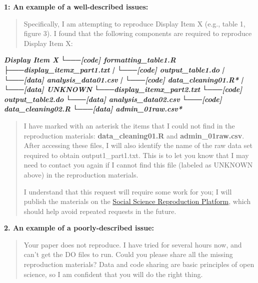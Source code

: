 \documentclass[
]{book}
\newenvironment{Shaded}{\begin{snugshade}}{\end{snugshade}}
\newcommand{\InformationTok}[1]{\textcolor[rgb]{0.56,0.35,0.01}{\textbf{\textit{#1}}}}
\begin{document}
\textbf{1: An example of a well-described issues:}

\begin{quote}
Specifically, I am attempting to reproduce Display Item X (e.g., table 1, figure 3). I found that the following components are required to reproduce Display Item X:
\end{quote}

\begin{Shaded}
\begin{Highlighting}[]
\InformationTok{         Display Item X}
\InformationTok{            └───[code] formatting\_table1.R}
\InformationTok{                ├───display\_itemx\_part1.txt  }
\InformationTok{                |   └───[code] output\_table1.do           }
\InformationTok{                |       └───[data] analysis\_data01.csv}
\InformationTok{                |          └───[code] data\_cleaning01.R*}
\InformationTok{                |             └───[data] UNKNOWN}
\InformationTok{                └───display\_itemx\_part2.txt  }
\InformationTok{                    └───[code] output\_table2.do           }
\InformationTok{                        └───[data] analysis\_data02.csv}
\InformationTok{                           └───[code] data\_cleaning02.R}
\InformationTok{                              └───[data] admin\_01raw.csv* }
\end{Highlighting}
\end{Shaded}

\begin{quote}
I have marked with an asterisk the items that I could not find in the reproduction materials: \textbf{data\_cleaning01.R} and \textbf{admin\_01raw.csv}. After accessing these files, I will also identify the name of the raw data set required to obtain output1\_part1.txt. This is to let you know that I may need to contact you again if I cannot find this file (labeled as UNKNOWN above) in the reproduction materials.

I understand that this request will require some work for you; I will publish the materials on the \href{https://www.socialsciencereproduction.org/}{Social Science Reproduction Platform}, which should help avoid repeated requests in the future.
\end{quote}

\textbf{2. An example of a poorly-described issue:}

\begin{quote}
Your paper does not reproduce. I have tried for several hours now, and can't get the DO files to run. Could you please share all the missing reproduction materials? Data and code sharing are basic principles of open science, so I am confident that you will do the right thing.
\end{quote}
\end{document}
